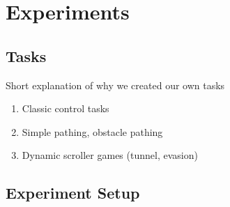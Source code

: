 \section{Experiments}

\subsection{Tasks}
Short explanation of why we created our own tasks
\begin{enumerate}
	\item Classic control tasks
	\item Simple pathing, obstacle pathing
	\item Dynamic scroller games (tunnel, evasion)
\end{enumerate}

\subsection{Experiment Setup}